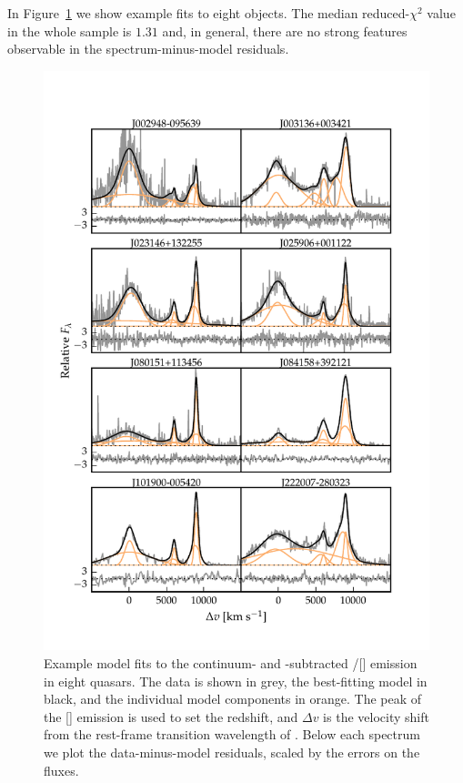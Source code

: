 In Figure~\ref{fig:example_spectrum_grid} we show example fits to eight objects.
The median reduced-$\chi^2$ value in the whole sample is $1.31$ and, in general, there are no strong features observable in the spectrum-minus-model residuals.

\begin{figure}
    \centering
    \includegraphics[width=\textwidth]{figures/chapter04/example_spectrum_grid.pdf}
    \caption[{Example model fits to the \hbns/[] emission in eight quasars.}]{Example model fits to the continuum- and -subtracted \hbns/[] emission in eight quasars. The data is shown in grey, the best-fitting model in black, and the individual model components in orange. The peak of the [] emission is used to set the redshift, and $\Delta{v}$ is the velocity shift from the rest-frame transition wavelength of \hbns. Below each spectrum we plot the data-minus-model residuals, scaled by the errors on the fluxes.}
    \label{fig:example_spectrum_grid}
\end{figure}


